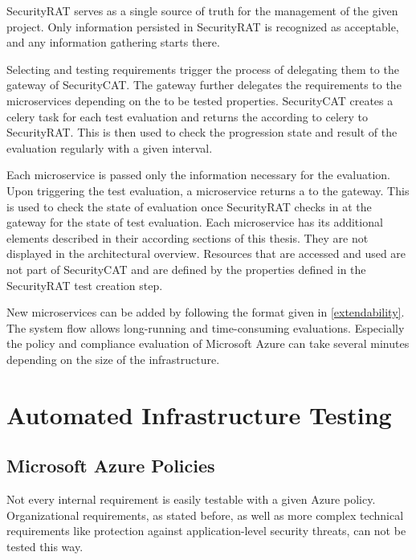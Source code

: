 SecurityRAT serves as a single source of truth for the management of the given project. Only information persisted in SecurityRAT is recognized as acceptable, and any information gathering starts there.

Selecting and testing requirements trigger the process of delegating them to the gateway of SecurityCAT. The gateway further delegates the requirements to the microservices depending on the to be tested properties. SecurityCAT creates a celery task for each test evaluation and returns the according to celery  to SecurityRAT. This  is then used to check the progression state and result of the evaluation regularly with a given interval.

Each microservice is passed only the information necessary for the evaluation. Upon triggering the test evaluation, a microservice returns a  to the gateway. This  is used to check the state of evaluation once SecurityRAT checks in at the gateway for the state of test evaluation.
Each microservice has its additional elements described in their according sections of this thesis. They are not displayed in the architectural overview. Resources that are accessed and used are not part of SecurityCAT and are defined by the properties defined in the SecurityRAT test creation step.

New microservices can be added by following the format given in \ref{extendability}. The system flow allows long-running and time-consuming evaluations. Especially the policy and compliance evaluation of Microsoft Azure can take several minutes depending on the size of the infrastructure.


\section{Automated Infrastructure Testing}
\label{automated_infrastructure_testing}

\subsection{Microsoft Azure Policies}
Not every internal requirement is easily testable with a given Azure policy. Organizational requirements, as stated before, as well as more complex technical requirements like protection against application-level security threats, can not be tested this way.

